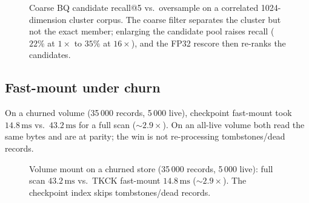 \documentclass[11pt,twocolumn]{article}
\begin{document}
\begin{figure}[t]
\centering
{}
\caption{Coarse BQ candidate recall@5 vs.\ oversample on a correlated
1024-dimension cluster corpus. The coarse filter separates the cluster but not
the exact member; enlarging the candidate pool raises recall
($22\%$ at $1\times$ to $35\%$ at $16\times$), and the FP32 rescore then
re-ranks the candidates.}
\label{fig:oversample}
\end{figure}

\subsection{Fast-mount under churn}
\label{sec:eval-mount}

On a churned volume (35\,000 records, 5\,000 live), checkpoint fast-mount took
$14.8\,\mathrm{ms}$ vs.\ $43.2\,\mathrm{ms}$ for a full scan
($\sim 2.9\times$). On an all-live volume both read the same bytes and are at
parity; the win is not re-processing tombstones/dead records.

\begin{figure}[t]
\centering
{}
\caption{Volume mount on a churned store (35\,000 records, 5\,000 live):
full scan $43.2\,\mathrm{ms}$ vs.\ TKCK fast-mount $14.8\,\mathrm{ms}$
($\sim 2.9\times$). The checkpoint index skips tombstones/dead records.}
\label{fig:mount}
\end{figure}
\end{document}
